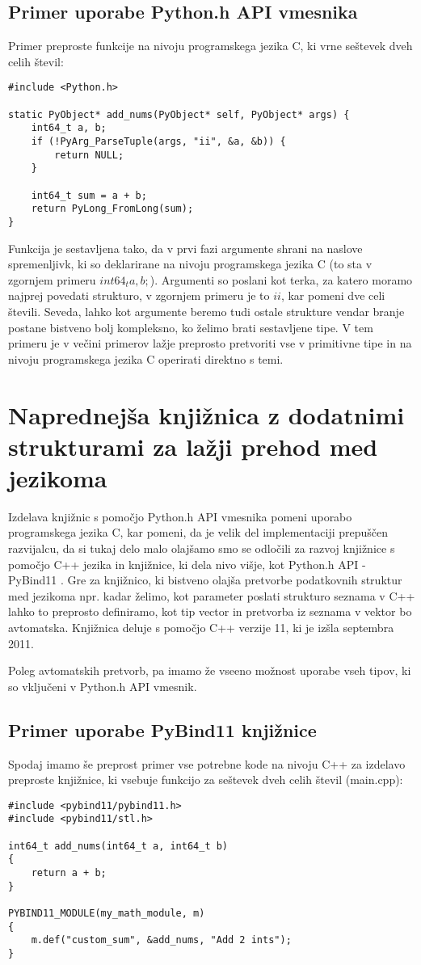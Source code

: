 \documentclass[a4paper,12pt,openright]{book}
\begin{document}
    \subsection{Primer uporabe Python.h API vmesnika}
    Primer preproste funkcije na nivoju programskega jezika C, ki vrne seštevek dveh celih števil:
\begin{verbatim}
#include <Python.h>

static PyObject* add_nums(PyObject* self, PyObject* args) {
    int64_t a, b;
    if (!PyArg_ParseTuple(args, "ii", &a, &b)) {
        return NULL;
    }

    int64_t sum = a + b;
    return PyLong_FromLong(sum);
}
\end{verbatim}

    \noindent
    Funkcija je sestavljena tako, da v prvi fazi argumente shrani na naslove spremenljivk, ki so deklarirane na nivoju programskega jezika C (to sta v zgornjem primeru $int64_t a, b;$). Argumenti so poslani kot terka, za katero moramo najprej povedati strukturo, v zgornjem primeru je to $ii$, kar pomeni dve celi števili. Seveda, lahko kot argumente beremo tudi ostale strukture vendar branje postane bistveno bolj kompleksno, ko želimo brati sestavljene tipe. V tem primeru je v večini primerov lažje preprosto pretvoriti vse v primitivne tipe in na nivoju programskega jezika C operirati direktno s temi.

    \section{Naprednejša knjižnica z dodatnimi strukturami za lažji prehod med jezikoma}

    Izdelava knjižnic s pomočjo Python.h API vmesnika pomeni uporabo programskega jezika C, kar pomeni, da je velik del implementaciji prepuščen razvijalcu, da si tukaj delo malo olajšamo smo se odločili za razvoj knjižnice s pomočjo C++ jezika in knjižnice, ki dela nivo višje, kot Python.h API - PyBind11 \cite{PYBIND11_GITHUB}. Gre za knjižnico, ki bistveno olajša pretvorbe podatkovnih struktur med jezikoma npr. kadar želimo, kot parameter poslati strukturo seznama v C++ lahko to preprosto definiramo, kot tip vector in pretvorba iz seznama v vektor bo avtomatska. Knjižnica deluje s pomočjo C++ verzije 11, ki je izšla septembra 2011.

    Poleg avtomatskih pretvorb, pa imamo že vseeno možnost uporabe vseh tipov, ki so vključeni v Python.h API vmesnik.

    \subsection{Primer uporabe PyBind11 knjižnice}
    Spodaj imamo še preprost primer vse potrebne kode na nivoju C++ za izdelavo preproste knjižnice, ki vsebuje funkcijo za seštevek dveh celih števil (main.cpp):
\begin{verbatim}
#include <pybind11/pybind11.h>
#include <pybind11/stl.h>

int64_t add_nums(int64_t a, int64_t b)
{
    return a + b;
}

PYBIND11_MODULE(my_math_module, m)
{
    m.def("custom_sum", &add_nums, "Add 2 ints");
}
\end{verbatim}
\end{document}
